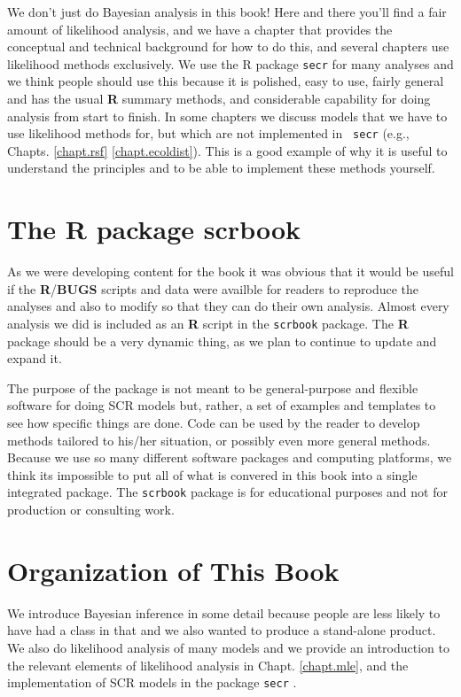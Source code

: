 We don't just do Bayesian analysis in this book! Here and there you'll
find a fair amount of likelihood analysis, and we have a chapter that
provides the conceptual and technical background for how to do this,
and several chapters use likelihood methods exclusively. We use the R
package \mbox{\tt secr} \citep{efford_etal:2009euring} for many
analyses and we think people should use this because it is polished,
easy to use, fairly general and has the usual {\bf R} summary methods,
and considerable capability for doing analysis from start to
finish. In some chapters we discuss models that we have to use
likelihood methods for, but which are not implemented in \mbox{\tt
  secr} (e.g., Chapts. \ref{chapt.rsf} \ref{chapt.ecoldist}). This is
a good example of why it is useful to understand the principles and to
be able to implement these methods yourself.

\section*{The R package scrbook}

As we were developing content for the book it was obvious that it
would be useful if the {\bf R}/{\bf BUGS} scripts and data were availble for
readers to reproduce the analyses and also to modify so that they can
do their own analysis.  Almost every analysis we did is included as an
{\bf R} script in the \mbox{\tt scrbook} package.
The {\bf R} package should be a very dynamic thing, as we plan to
continue to update and expand it.

The purpose of the package is not meant to be general-purpose and
flexible software for doing SCR models but, rather, a set of examples
and templates to see how specific things are done. Code can be used
by the reader to develop methods tailored to his/her situation, or
possibly even more general methods.  Because we use so many different
software packages and computing platforms, we think its impossible to
put all of what is convered in this book into a single integrated
package.  The \mbox{\tt scrbook} package is for educational purposes
and not for production or consulting work.


\section*{Organization of This Book}

We introduce Bayesian inference in some detail because people are less
likely to have had a class in that and we also wanted to produce a
stand-alone product.  We also do likelihood analysis of many models
and we provide an introduction to the relevant elements of likelihood
analysis in Chapt. \ref{chapt.mle}, and the implementation of SCR
models in the package \mbox{\tt secr} \citep{efford_etal:2009euring}.

